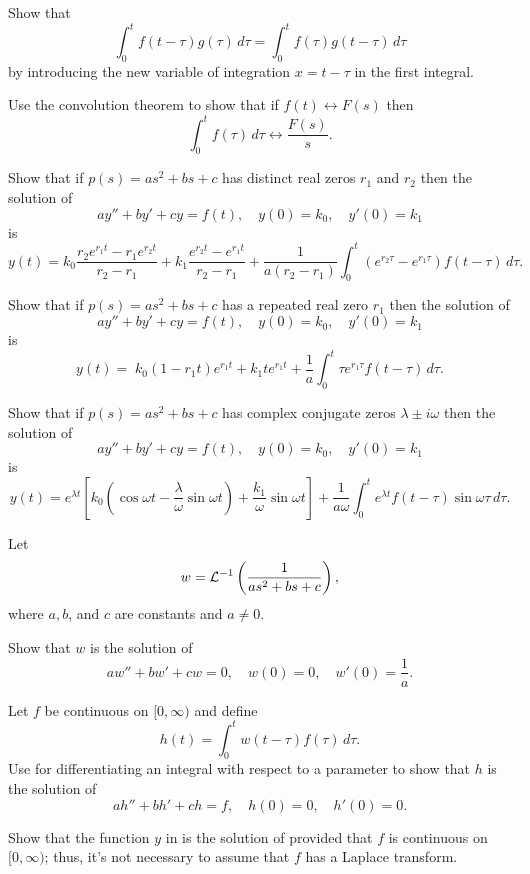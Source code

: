 \begin{exerciselist}
\item\label{exer:8.6.6}Show that
\[
\int_0^tf(t-\tau)g(\tau)\,d\tau=\int_0^tf(\tau)g(t-\tau)\,d\tau
\]
by introducing the new variable of integration $x=t-\tau$ in the first
integral.


\item\label{exer:8.6.7}Use the convolution theorem to show that if
$f(t)\leftrightarrow F(s)$ then
\[
\int_0^tf(\tau)\,d\tau\leftrightarrow\frac{F(s)}{s}.
\]

\item\label{exer:8.6.8}Show that if $p(s)=as^2+bs+c$ has
distinct real zeros $r_1$ and $r_2$ then
 the solution of
\[
ay''+by'+cy=f(t),\quad y(0)=k_0,\quad y'(0)=k_1
\]
is
\[
y(t)=k_0\frac{r_2e^{r_1t}-r_1e^{r_2t}}{r_2-r_1}
+k_1\frac{e^{r_2t}-e^{r_1t}}{r_2-r_1}
+\frac{1}{a(r_2-r_1)}\int_0^t(e^{r_2\tau}-e^{r_1\tau})f(t-\tau)\,d\tau.
\]

\item\label{exer:8.6.9}Show that if $p(s)=as^2+bs+c$ has
a repeated  real zero $r_1$ then
 the solution of
\[
ay''+by'+cy=f(t),\quad y(0)=k_0,\quad y'(0)=k_1
\]
is
\[
y(t)=\; k_0(1-r_1t)e^{r_1t}+k_1te^{r_1t}
+\frac{1}{a}\int_0^t\tau
e^{r_1\tau}f(t-\tau)\,d\tau.
\]

\item\label{exer:8.6.10}Show that if $p(s)=as^2+bs+c$ has
 complex conjugate zeros $\lambda\pm i\omega$
then the solution of
\[
ay''+by'+cy=f(t),\quad y(0)=k_0,\quad y'(0)=k_1
\]
is
\[
y(t)
=e^{\lambda t}\left[k_0(\cos\omega t-\frac{\lambda}{\omega}\sin\omega t)
+\frac{k_1}{\omega}\sin\omega t\right]
+\frac{1}{a\omega}\int_0^te^{\lambda t}f(t-\tau)\sin\omega\tau\,d\tau.
\]


\item\label{exer:8.6.11}Let
\[
w={\mathcal L}^{-1}\left(\frac{1}{as^2+bs+c}\right),
\]
where $a,b$, and $c$ are constants and $a\ne0$.
\begin{alist}
\item %
Show that $w$ is the solution of
\[
aw''+bw'+cw=0,\quad w(0)=0,\quad w'(0)=\frac{1}{a}.
\]
\item %
Let $f$ be continuous on $[0,\infty)$  and define
\[
h(t)=\int_0^t w(t-\tau)f(\tau)\,d\tau.
\]
Use
 for differentiating an integral with
respect to a parameter to show  that $h$ is the solution of
\[
ah''+bh'+ch=f,\quad h(0)=0,\quad h'(0)=0.
\]
\item %
 Show that the function $y$ in   is the solution of
 provided that $f$ is continuous on $[0,\infty)$;
thus, it's not necessary to assume that $f$ has a Laplace transform.
\end{alist}


\end{exerciselist}

